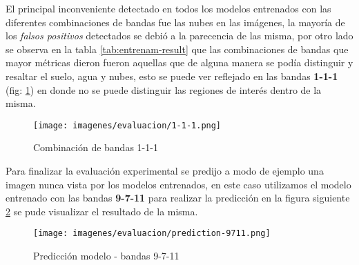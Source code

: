  
El principal inconveniente detectado en todos los modelos entrenados con las diferentes combinaciones de bandas fue las nubes en las imágenes, la mayoría de los \textit{falsos positivos} detectados se debió a la parecencia de las misma, por otro lado se observa en la tabla \ref{tab:entrenam-result} que las combinaciones de bandas que mayor métricas dieron fueron aquellas que de alguna manera se podía distinguir y resaltar el suelo, agua y nubes, esto se puede ver reflejado en las bandas  \textbf{1-1-1} (fig: \ref{Fig:imagen_banda_111}) en donde no se puede distinguir las regiones de interés dentro de la misma. 
 
 \begin{figure}[H]\centering
  \texttt{[image: imagenes/evaluacion/1-1-1.png]}
  \caption{Combinación de bandas 1-1-1} \label{Fig:imagen_banda_111}
\end{figure}
 
Para finalizar la evaluación experimental se predijo a modo de ejemplo una imagen nunca vista por los modelos entrenados, en este caso utilizamos el modelo entrenado con las bandas \textbf{9-7-11} para realizar la predicción en la figura siguiente  \ref{Fig: TP} se pude visualizar el resultado de la misma.

\begin{figure}[H]\centering
  \texttt{[image: imagenes/evaluacion/prediction-9711.png]}
  \caption{Predicción modelo - bandas 9-7-11} \label{Fig: TP}
\end{figure}














